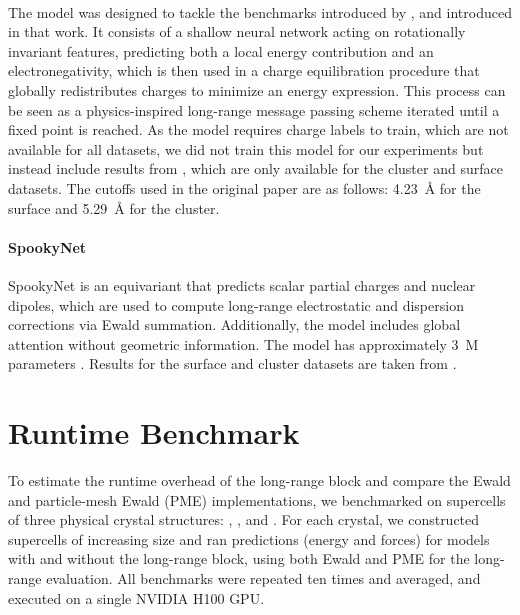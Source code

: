 \documentclass[10pt]{article} %
\newcommand{\CL}[1]{#1}
\begin{document}
\paragraph{\fgnn}
The \fgnn model was designed to tackle the benchmarks introduced by \cite{kfgb2021}, and introduced in that work. It consists of a shallow neural network acting on rotationally invariant features, predicting both a local energy contribution and an electronegativity, which is then used in a charge equilibration procedure that globally redistributes charges to minimize an energy expression. This process can be seen as a physics-inspired long-range message passing scheme iterated until a fixed point is reached. 
% 
As the model requires charge labels to train, which are not available for all datasets, we did not train this model for our experiments but instead include results from \citet{kfgb2021}, which are only available for the  cluster and  surface datasets. The cutoffs used in the original paper are as follows: \qty{4.23}{\angstrom} for the  surface and \qty{5.29}{\angstrom} for the  cluster.

\CL{
\paragraph{SpookyNet}
SpookyNet \citep{ucgssm2021} is an equivariant \mlp that predicts scalar partial charges and nuclear dipoles, which are used to compute long-range electrostatic and dispersion corrections via Ewald summation. Additionally, the model includes global attention without geometric information. The model has approximately \qty{3}{M} parameters \citep{bmc2023}. Results for the \ch{MgO} surface and \ch{NaCl} cluster datasets are taken from \citet{kfgb2021}.
}

\clearpage
\section{Runtime Benchmark}
\label{sec:apx-benchmark}

\CL{To estimate the runtime overhead of the long-range block and compare the Ewald and particle-mesh Ewald (PME) implementations, we benchmarked \lorem on supercells of three physical crystal structures: \ch{NaCl}, \ch{CsCl}, and \ch{Cu_2O}. For each crystal, we constructed supercells of increasing size and ran predictions (energy and forces) for \lorem models with and without the long-range block, using both Ewald and PME for the long-range evaluation. All benchmarks were repeated ten times and averaged, and executed on a single NVIDIA H100 GPU.}
\end{document}
